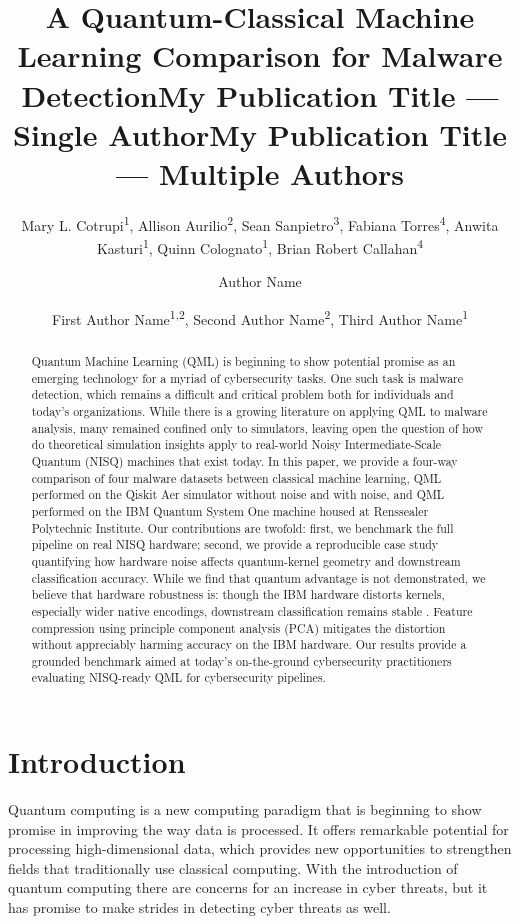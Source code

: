 \documentclass[letterpaper]{article} %
\title{A Quantum-Classical Machine Learning Comparison for Malware Detection}
\author{
    Mary L. Cotrupi\textsuperscript{\rm 1}, Allison Aurilio\textsuperscript{\rm 2}, Sean Sanpietro\textsuperscript{\rm 3}, Fabiana Torres\textsuperscript{\rm 4}, Anwita Kasturi\textsuperscript{\rm 1}, Quinn Colognato\textsuperscript{\rm 1}, Brian Robert Callahan\textsuperscript{\rm 4}
}
\title{My Publication Title --- Single Author}
\author {
    Author Name
}
\title{My Publication Title --- Multiple Authors}
\author {
    First Author Name\textsuperscript{\rm 1,\rm 2},
    Second Author Name\textsuperscript{\rm 2},
    Third Author Name\textsuperscript{\rm 1}
}
\begin{document}
\maketitle

\begin{abstract}
Quantum Machine Learning (QML) is beginning to show potential promise as an emerging technology for a myriad of cybersecurity tasks. One such task is malware detection, which remains a difficult and critical problem both for individuals and today's organizations. While there is a growing literature on applying QML to malware analysis, many remained confined only to simulators, leaving open the question of how do theoretical simulation insights apply to real-world Noisy Intermediate-Scale Quantum (NISQ) machines that exist today. In this paper, we provide a four-way comparison of four malware datasets between classical machine learning, QML performed on the Qiskit Aer simulator without noise and with noise, and QML performed on the IBM Quantum System One machine housed at Renssealer Polytechnic Institute. Our contributions are twofold: first, we benchmark the full pipeline on real NISQ hardware; second, we provide a reproducible case study quantifying how hardware noise affects quantum-kernel geometry and downstream classification accuracy. While we find that quantum advantage is not demonstrated, we believe that hardware robustness is: though the IBM hardware distorts kernels, especially wider native encodings, downstream classification remains stable . Feature compression using principle component analysis (PCA) mitigates the distortion without appreciably harming accuracy on the IBM hardware. Our results provide a grounded benchmark aimed at today's on-the-ground cybersecurity practitioners evaluating NISQ-ready QML for cybersecurity pipelines.
\end{abstract}

\section{Introduction}

Quantum computing is a new computing paradigm that is beginning to show promise in improving the way data is processed. It offers remarkable potential for processing high-dimensional data, which provides new opportunities to strengthen fields that traditionally use classical computing. With the introduction of quantum computing there are concerns for an increase in cyber threats, but it has promise to make strides in detecting cyber threats as well.  
\end{document}
